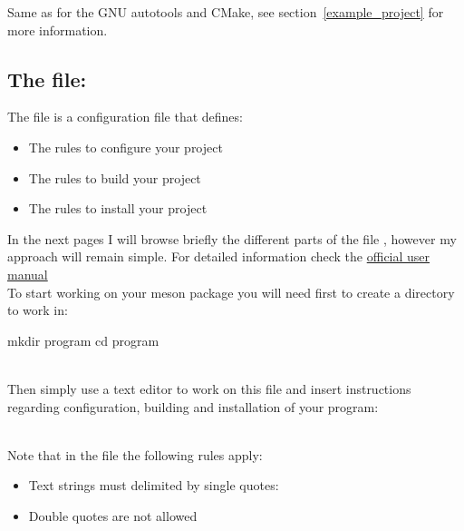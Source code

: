 Same as for the GNU autotools and CMake, see section~\ref{example_project} for more information. 

\subsection{The file: }

The file  is a configuration file that defines: 
\begin{itemize}
\item The rules to configure your project
\item The rules to build your project
\item The rules to install your project
\end{itemize}
In the next pages I will browse briefly the different parts of the file , however my approach will remain simple. 
For detailed information check the \href{https://mesonbuild.com/Manual.html}{official user manual} \\[0.25cm]
To start working on your meson package you will need first to create a directory to work in:
\begin{script}
\fprompt{~} mkdir program
\fprompt{~} cd program
\end{script}
\\[-0.25cm]
\noindent Then simply use a text editor to work on this file and insert instructions regarding configuration, building and installation of your program:
\begin{script}
  
\end{script}
\\[-0.75cm]
\noindent Note that in the  file the following rules apply:
\begin{itemize}
\item Text strings must delimited by single quotes: \bftt{\textquotesingle}
\item Double quotes  are not allowed
\end{itemize}

